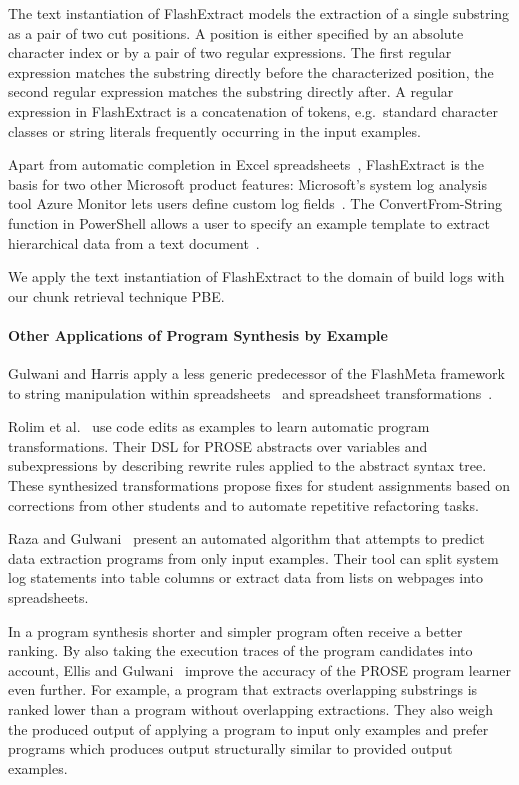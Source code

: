 \documentclass[\myrootdir/main.tex]{subfiles}
\begin{document}
The text instantiation of FlashExtract models the extraction of a single substring as a pair of two cut positions.
A position is either specified by an absolute character index or by a pair of two regular expressions.
The first regular expression matches the substring directly before the characterized position, the second regular expression matches the substring directly after.
A regular expression in FlashExtract is a concatenation of tokens, e.g.\ standard character classes or string literals frequently occurring in the input examples.

Apart from automatic completion in Excel spreadsheets~\cite{excel2019flashfill}, FlashExtract is the basis for two other Microsoft product features:
Microsoft's system log analysis tool Azure Monitor lets users define custom log fields~\cite{azure2019custom}.
The ConvertFrom-String function in PowerShell allows a user to specify an example template to extract hierarchical data from a text document~\cite{powershell2019convert}.

We apply the text instantiation of FlashExtract to the domain of build logs with our chunk retrieval technique PBE\@.

\paragraph{Other Applications of Program Synthesis by Example}
Gulwani and Harris apply a less generic predecessor of the FlashMeta framework to string manipulation within spreadsheets~\cite{gulwani2011automating} and spreadsheet transformations~\cite{harris2011spreadsheet}.

Rolim et al.~\cite{rolim2017learning} use code edits as examples to learn automatic program transformations.
Their DSL for PROSE abstracts over variables and subexpressions by describing rewrite rules applied to the abstract syntax tree.
These synthesized transformations propose fixes for student assignments based on corrections from other students and to automate repetitive refactoring tasks.

Raza and Gulwani~\cite{raza2017automated} present an automated algorithm that attempts to predict data extraction programs from only input examples.
Their tool can split system log statements into table columns or extract data from lists on webpages into spreadsheets.

In a program synthesis shorter and simpler program often receive a better ranking.
By also taking the execution traces of the program candidates into account, Ellis and Gulwani~\cite{ellis2017learning} improve the accuracy of the PROSE program learner even further.
For example, a program that extracts overlapping substrings is ranked lower than a program without overlapping extractions.
They also weigh the produced output of applying a program to input only examples and prefer programs which produces output structurally similar to provided output examples.
\end{document}
